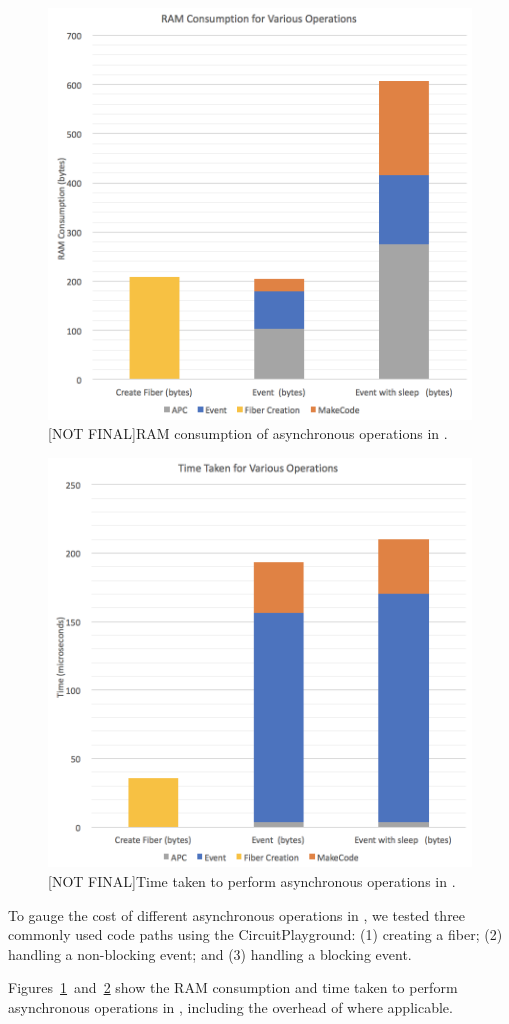 \begin{figure}[ht]
    \includegraphics[width=.6\columnwidth]{images/ram-consumption.png}
\caption{\label{fig:ram-consumption}[NOT FINAL]RAM consumption of asynchronous operations in \CO.}
\end{figure}

\begin{figure}[ht]
    \includegraphics[width=.6\columnwidth]{images/time-taken.png}
\caption{\label{fig:time-taken}[NOT FINAL]Time taken to perform asynchronous operations in \CO.}
\end{figure}
To gauge the cost of different asynchronous operations in \CON, we tested three commonly used code paths using the CircuitPlayground: (1) creating a fiber; (2) handling a non-blocking event; and (3) handling a blocking event.

Figures~\ref{fig:ram-consumption}~and~\ref{fig:time-taken} show the RAM consumption and time taken to perform asynchronous operations in \CO, including the overhead of \MC where applicable.

